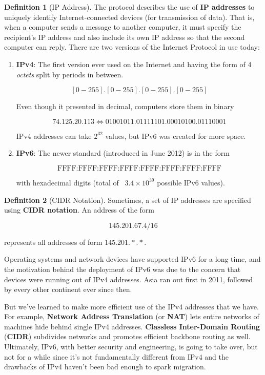 \documentclass{article}
\theoremstyle{definition}
\newtheorem{definition}{Definition}[section]
\begin{document}
    \begin{definition}[IP Address]
      The protocol describes the use of \textbf{IP addresses} to uniquely identify Internet-connected devices (for transmission of data). That is, when a computer sends a message to another computer, it must specify the recipient's IP address and also include its own IP address so that the second computer can reply. There are two versions of the Internet Protocol in use today: 
      \begin{enumerate}
          \item \textbf{IPv4}: The first version ever used on the Internet and having the form of 4 \textit{octets} split by periods in between. 

            \[[0-255].[0-255].[0-255].[0-255]\]

          Even though it presented in decimal, computers store them in binary 

            \[74.125.20.113 \iff 01001011.01111101.00010100.01110001\]

          IPv4 addresses can take $2^{32}$ values, but IPv6 was created for more space.

          \item \textbf{IPv6}: The newer standard (introduced in June 2012) is in the form 

            \[\text{FFFF:FFFF:FFFF:FFFF:FFFF:FFFF:FFFF:FFFF}\]

          with hexadecimal digits (total of ~$3.4 \times 10^{39}$ possible IPv6 values). 
      \end{enumerate}
    \end{definition}


    \begin{definition}[CIDR Notation]
      Sometimes, a set of IP addresses are specified using \textbf{CIDR notation}. An address of the form 

        \[145.201.67.4/16\]

      represents all addresses of form $145.201.\ast.\ast$. 
    \end{definition}

    Operating systems and network devices have supported IPv6 for a long time, and the motivation behind the deployment of IPv6 was due to the concern that devices were running out of IPv4 addresses. Asia ran out first in 2011, followed by every other continent ever since then. 

    But we've learned to make more efficient use of the IPv4 addresses that we have. For example, \textbf{Network Address Translation} (or \textbf{NAT}) lets entire networks of machines hide behind single IPv4 addresses. \textbf{Classless Inter-Domain Routing} (\textbf{CIDR}) subdivides networks and promotes efficient backbone routing as well. Ultimately, IPv6, with better security and engineering, is going to take over, but not for a while since it's not fundamentally different from IPv4 and the drawbacks of IPv4 haven't been bad enough to spark migration. 
\end{document}
